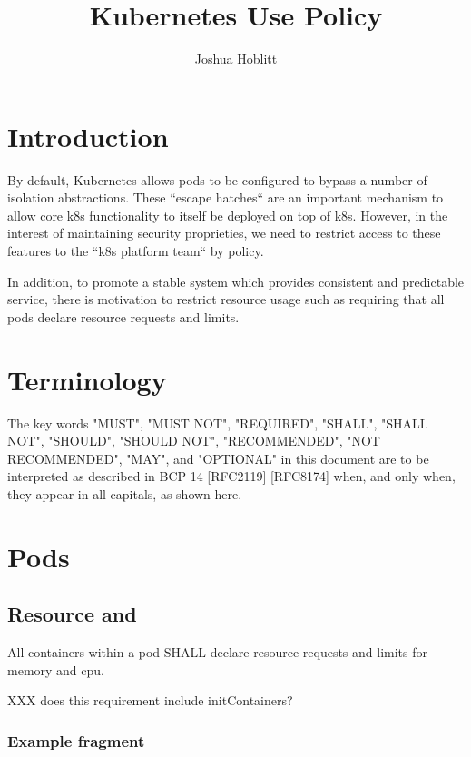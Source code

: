 \documentclass[PMO,authoryear,toc]{lsstdoc}
\title{Kubernetes Use Policy}
\author{%
Joshua Hoblitt
}
\date{\vcsDate}
\begin{document}
\maketitle

\section{Introduction}\label{sec:intro}

By default, Kubernetes allows pods to be configured to bypass a number of isolation abstractions.
These ``escape hatches`` are an important mechanism to allow core k8s functionality to itself be deployed on top of k8s.
However, in the interest of maintaining security proprieties, we need to restrict access to these features to the ``k8s platform team`` by policy.

In addition, to promote a stable system which provides consistent and predictable service, there is motivation to restrict resource usage such as requiring that all pods declare resource requests and limits.

\section{Terminology}\label{sec:term}

The key words "MUST", "MUST NOT", "REQUIRED", "SHALL", "SHALL NOT", "SHOULD", "SHOULD NOT", "RECOMMENDED", "NOT RECOMMENDED", "MAY", and "OPTIONAL" in this document are to be interpreted as described in BCP 14 [RFC2119] [RFC8174] when, and only when, they appear in all capitals, as shown here.

\section{Pods}\label{sec:pod}

\subsection{Resource  and }

All containers within a pod SHALL declare resource requests and limits for memory and cpu.

XXX does this requirement include initContainers?

\subsubsection{Example  fragment}
\end{document}
